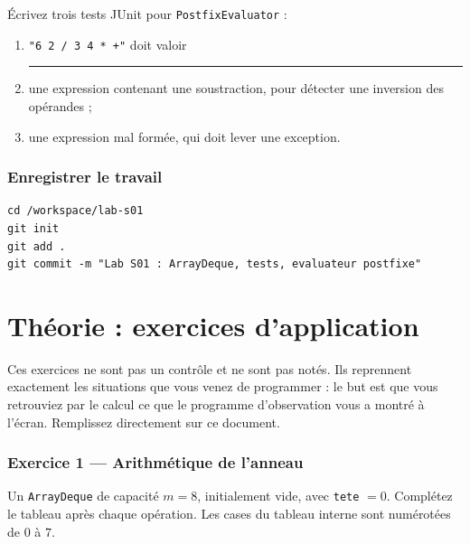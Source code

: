 \documentclass[11pt,a4paper]{article}
\newcommand{\lig}[1]{\rule{#1}{0.4pt}}
\begin{document}
\begin{exercicebox}
Écrivez trois tests JUnit pour \texttt{PostfixEvaluator} :
\begin{enumerate}[nosep]
    \item \texttt{"6 2 / 3 4 * +"} doit valoir \lig{1.5cm}
    \item une expression contenant une soustraction, pour détecter une
          inversion des opérandes ;
    \item une expression mal formée, qui doit lever une exception.
\end{enumerate}
\end{exercicebox}

\section{Enregistrer le travail}

\begin{lstlisting}[style=bash,caption={Git}]
cd /workspace/lab-s01
git init
git add .
git commit -m "Lab S01 : ArrayDeque, tests, evaluateur postfixe"
\end{lstlisting}

\newpage
\part{Théorie : exercices d'application}

\begin{infobox}
Ces exercices ne sont pas un contrôle et ne sont pas notés. Ils reprennent
exactement les situations que vous venez de programmer : le but est que vous
retrouviez par le calcul ce que le programme d'observation vous a montré à
l'écran. Remplissez directement sur ce document.
\end{infobox}

\section{Exercice 1 --- Arithmétique de l'anneau}

Un \texttt{ArrayDeque} de capacité $m = 8$, initialement vide, avec
\texttt{tete} $= 0$. Complétez le tableau après chaque opération. Les cases
du tableau interne sont numérotées de $0$ à $7$.
\end{document}
